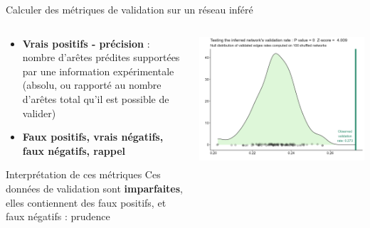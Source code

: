 \begin{frame}{Calculer des métriques de validation sur un réseau inféré}

\begin{columns}
\begin{column}{.48\textwidth}
\begin{itemize}\small
    \item \textbf{Vrais positifs - précision} : nombre d'arêtes prédites supportées par une information expérimentale (absolu, ou rapporté au nombre d'arêtes total qu'il est possible de valider)
    
    \item \textbf{Faux positifs, vrais négatifs, faux négatifs, rappel}
\end{itemize}
\begin{alertblock}{\small \danger Interprétation de ces métriques}\scriptsize
Ces données de validation sont \textbf{imparfaites}, elles contiennent des faux positifs, et faux négatifs : prudence
\end{alertblock}
\end{column}
\begin{column}{.48\textwidth}
\includegraphics[scale = 0.3]{Figures/Regression/validationtest.png}
\end{column}
\end{columns}
\end{frame}
